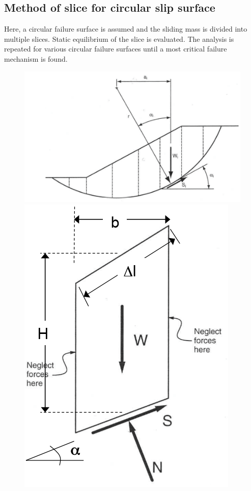     \subsection{Method of slice for circular slip surface}
    
        Here, a circular failure surface is assumed and the sliding mass is divided into multiple slices. Static equilibrium of the slice is evaluated. The analysis is repeated for various circular failure surfaces until a most critical failure mechanism is found.
        
        \begin{figure}[h!]
        \begin{multicols}{2}
            \includegraphics[scale=0.4]{Verastegui/images/V18.PNG}
            \vfill\null\columnbreak
            \includegraphics[scale=0.4]{Verastegui/images/V19.PNG}
        \end{multicols}
        \end{figure}
        
